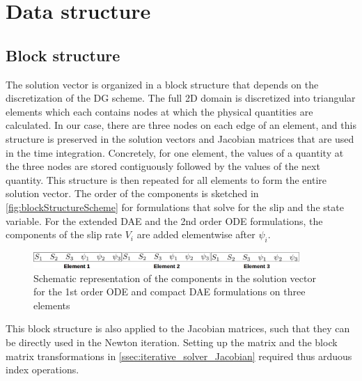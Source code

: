 \section{Data structure}
\label{sec:44mul4SEAS__Data}
\subsection{Block structure}
The solution vector is organized in a block structure that depends on the discretization of the DG scheme. The full 2D domain is discretized into triangular elements which each contains nodes at which the physical quantities are calculated. In our case, there are three nodes on each edge of an element, and this structure is preserved in the solution vectors and Jacobian matrices that are used in the time integration. Concretely, for one element, the values of a quantity at the three nodes are stored contiguously followed by the values of the next quantity. This structure is then repeated for all elements to form the entire solution vector. The order of the components is sketched in \autoref{fig:blockStructureScheme} for formulations that solve for the slip and the state variable. For the extended DAE and the 2nd order ODE formulations, the components of the slip rate $V_i$ are added elementwise after $\psi_i$.

\begin{figure}[H]
	\centering
	\includegraphics[width=0.9\textwidth]{images/blockStructure.png}
	\caption{Schematic representation of the components in the solution vector for the 1st order ODE and compact DAE formulations on three elements}
	\label{fig:blockStructureScheme}
\end{figure}

This block structure is also applied to the Jacobian matrices, such that they can be directly used in the Newton iteration. Setting up the matrix and the block matrix transformations in \autoref{ssec:iterative_solver_Jacobian} required thus arduous index operations.

